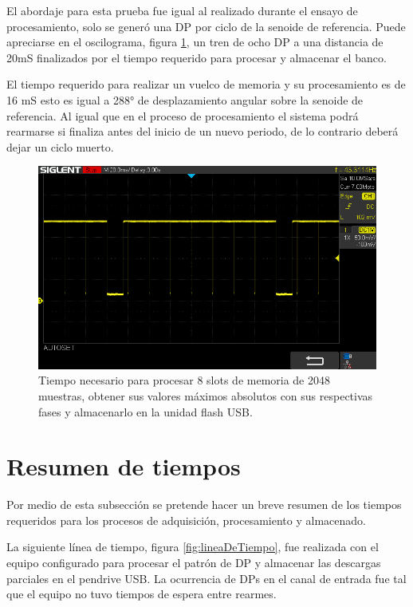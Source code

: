 El abordaje para esta prueba fue igual al realizado durante el ensayo de procesamiento, solo se generó una DP por ciclo de la senoide de referencia. Puede apreciarse en el oscilograma, figura \ref{fig:tiempoSaveAll}, un tren de ocho DP a una distancia de 20mS finalizados por el tiempo requerido para procesar y almacenar el banco.

El tiempo requerido para realizar un vuelco de memoria y su procesamiento es de 16 mS esto es igual a 288° de desplazamiento angular sobre la senoide de referencia. Al igual que en el proceso de procesamiento el sistema podrá rearmarse si finaliza antes del inicio de un nuevo periodo, de lo contrario deberá dejar un ciclo muerto.

\begin{figure}[ht]
	\centering
	\includegraphics[width=133mm]{./Figures/tiempoSaveAll.png}
	\caption{Tiempo necesario para procesar 8 slots de memoria de 2048 muestras, obtener sus valores máximos absolutos con sus respectivas fases y almacenarlo en la unidad flash USB.}
	\label{fig:tiempoSaveAll}
\end{figure}

\newpage

\vspace{5mm}

\section{Resumen de tiempos}

Por medio de esta subsección se pretende hacer un breve resumen de los tiempos requeridos para los procesos de adquisición, procesamiento y almacenado.

La siguiente línea de tiempo, figura \ref{fig:lineaDeTiempo}, fue realizada con el equipo configurado para procesar el patrón de DP y almacenar las descargas parciales en el pendrive USB. La ocurrencia de DPs en el canal de entrada fue tal que el equipo no tuvo tiempos de espera entre rearmes.

